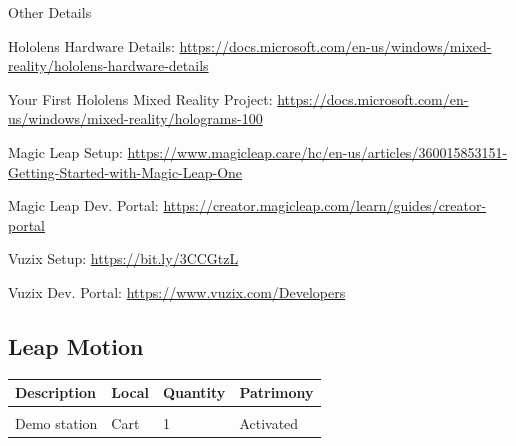 {\Large Other Details}
\vspace{1em}

Hololens Hardware Details: \url{https://docs.microsoft.com/en-us/windows/mixed-reality/hololens-hardware-details}

Your First Hololens Mixed Reality Project: \url{https://docs.microsoft.com/en-us/windows/mixed-reality/holograms-100}

\vspace{1em}

Magic Leap Setup: \url{https://www.magicleap.care/hc/en-us/articles/360015853151-Getting-Started-with-Magic-Leap-One}

Magic Leap Dev. Portal: \url{https://creator.magicleap.com/learn/guides/creator-portal}

\vspace{1em}

Vuzix Setup: \url{https://bit.ly/3CCGtzL}

Vuzix Dev. Portal: \url{https://www.vuzix.com/Developers}

\newpage

\subsection{Leap Motion}
\begin{tabularx}{\textwidth}{ Y  Y  Y  Y }
    \textbf{Description} &  \textbf{Local} &  \textbf{Quantity} & \textbf{Patrimony}\\
    \hline \\
     Demo station & Cart & 1 & Activated
\end{tabularx}
\vspace{1cm}

